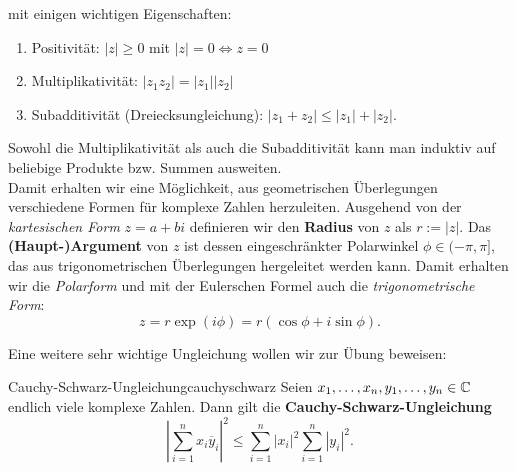 mit einigen wichtigen Eigenschaften:
\begin{enumerate}[({M}1)]
\item Positivität: $|z| \geq 0$ mit $|z| = 0 \iff z=0$
\item Multiplikativität: $|z_1z_2| = |z_1||z_2|$
\item Subadditivität (Dreiecksungleichung): $|z_1+z_2| \leq |z_1| + |z_2|$.
\end{enumerate}
Sowohl die Multiplikativität als auch die Subadditivität kann man induktiv auf beliebige  Produkte bzw. Summen ausweiten.\\
Damit erhalten wir eine Möglichkeit, aus geometrischen Überlegungen verschiedene Formen für komplexe Zahlen herzuleiten. Ausgehend von der \textit{kartesischen Form} $z=a+bi$ definieren wir den \textbf{Radius} von $z$ als $r := |z|$. Das \textbf{(Haupt-)Argument} von $z$ ist dessen eingeschränkter Polarwinkel $\phi \in (-\pi, \pi]$, das aus trigonometrischen Überlegungen hergeleitet werden kann. Damit erhalten wir die \textit{Polarform} und mit der Eulerschen Formel auch die \textit{trigonometrische Form}:
\begin{equation}
z = r \exp(i\phi) = r(\cos \phi + i \sin \phi).
\end{equation} 
\begin{figure}
\centering
{}
\end{figure}
Eine weitere sehr wichtige Ungleichung wollen wir zur Übung beweisen:
\begin{satz}{Cauchy-Schwarz-Ungleichung}{cauchyschwarz}
Seien $x_1, \dots, x_n, y_1, \dots, y_n \in \mathbb{C}$ endlich viele komplexe Zahlen. Dann gilt die \textbf{Cauchy-Schwarz-Ungleichung}
\begin{equation}
\left| \sum_{i=1}^n x_i \overline{y}_i\right|^2 \leq \sum_{i=1}^n |x_i|^2 \sum_{i=1}^n |y_i|^2.
\end{equation}
\end{satz}
